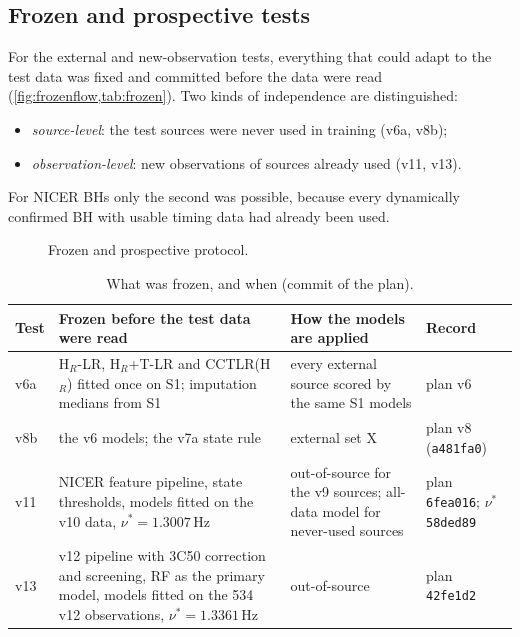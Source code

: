 \subsection{Frozen and prospective tests}\label{sec:frozen}
For the external and new-observation tests, everything that could adapt to the test data was fixed and committed before the
data were read (\cref{fig:frozenflow,tab:frozen}). Two kinds of independence are distinguished:
\begin{itemize}
\item \emph{source-level}: the test sources were never used in training (v6a, v8b);
\item \emph{observation-level}: new observations of sources already used (v11, v13).
\end{itemize}
For NICER BHs only the second was possible, because every dynamically confirmed BH with usable timing data had already been
used.

\begin{figure}[htbp]
\centering

\caption{Frozen and prospective protocol.}\label{fig:frozenflow}
\end{figure}

\begin{table}[htbp]
\centering\small
\caption{What was frozen, and when (commit of the plan).}\label{tab:frozen}
\begin{tabularx}{\textwidth}{@{}>{\raggedright\arraybackslash}p{1.1cm}>{\raggedright\arraybackslash}X>{\raggedright\arraybackslash}p{4.0cm}>{\raggedright\arraybackslash}p{2.9cm}@{}}
\toprule
Test & Frozen before the test data were read & How the models are applied & Record \\
\midrule
v6a & H$_R$-LR, H$_R$+T-LR and CCTLR(H$_R$) fitted once on S1; imputation medians from S1 & every external source scored by the same S1 models & plan v6 \\
v8b & the v6 models; the v7a state rule & external set X & plan v8 (\texttt{a481fa0}) \\
v11 & NICER feature pipeline, state thresholds, models fitted on the v10 data, $\nu^\ast=1.3007$\,Hz & out-of-source for the v9 sources; all-data model for never-used sources & plan \texttt{6fea016}; $\nu^\ast$ \texttt{58ded89} \\
v13 & v12 pipeline with 3C50 correction and screening, RF as the primary model, models fitted on the 534 v12 observations, $\nu^\ast=1.3361$\,Hz & out-of-source & plan \texttt{42fe1d2} \\
\bottomrule
\end{tabularx}
\end{table}

